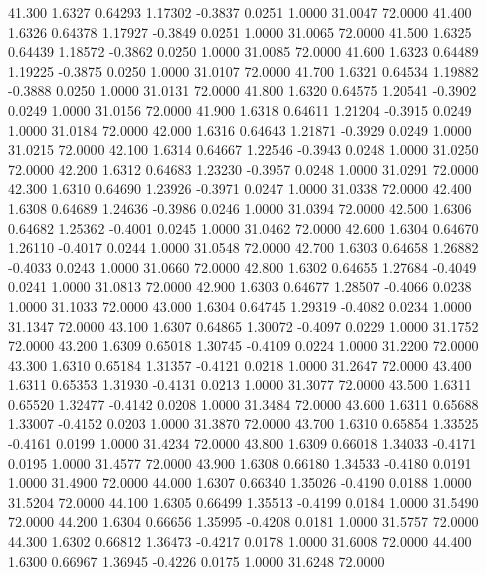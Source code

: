   41.300   1.6327   0.64293   1.17302  -0.3837   0.0251   1.0000  31.0047  72.0000
  41.400   1.6326   0.64378   1.17927  -0.3849   0.0251   1.0000  31.0065  72.0000
  41.500   1.6325   0.64439   1.18572  -0.3862   0.0250   1.0000  31.0085  72.0000
  41.600   1.6323   0.64489   1.19225  -0.3875   0.0250   1.0000  31.0107  72.0000
  41.700   1.6321   0.64534   1.19882  -0.3888   0.0250   1.0000  31.0131  72.0000
  41.800   1.6320   0.64575   1.20541  -0.3902   0.0249   1.0000  31.0156  72.0000
  41.900   1.6318   0.64611   1.21204  -0.3915   0.0249   1.0000  31.0184  72.0000
  42.000   1.6316   0.64643   1.21871  -0.3929   0.0249   1.0000  31.0215  72.0000
  42.100   1.6314   0.64667   1.22546  -0.3943   0.0248   1.0000  31.0250  72.0000
  42.200   1.6312   0.64683   1.23230  -0.3957   0.0248   1.0000  31.0291  72.0000
  42.300   1.6310   0.64690   1.23926  -0.3971   0.0247   1.0000  31.0338  72.0000
  42.400   1.6308   0.64689   1.24636  -0.3986   0.0246   1.0000  31.0394  72.0000
  42.500   1.6306   0.64682   1.25362  -0.4001   0.0245   1.0000  31.0462  72.0000
  42.600   1.6304   0.64670   1.26110  -0.4017   0.0244   1.0000  31.0548  72.0000
  42.700   1.6303   0.64658   1.26882  -0.4033   0.0243   1.0000  31.0660  72.0000
  42.800   1.6302   0.64655   1.27684  -0.4049   0.0241   1.0000  31.0813  72.0000
  42.900   1.6303   0.64677   1.28507  -0.4066   0.0238   1.0000  31.1033  72.0000
  43.000   1.6304   0.64745   1.29319  -0.4082   0.0234   1.0000  31.1347  72.0000
  43.100   1.6307   0.64865   1.30072  -0.4097   0.0229   1.0000  31.1752  72.0000
  43.200   1.6309   0.65018   1.30745  -0.4109   0.0224   1.0000  31.2200  72.0000
  43.300   1.6310   0.65184   1.31357  -0.4121   0.0218   1.0000  31.2647  72.0000
  43.400   1.6311   0.65353   1.31930  -0.4131   0.0213   1.0000  31.3077  72.0000
  43.500   1.6311   0.65520   1.32477  -0.4142   0.0208   1.0000  31.3484  72.0000
  43.600   1.6311   0.65688   1.33007  -0.4152   0.0203   1.0000  31.3870  72.0000
  43.700   1.6310   0.65854   1.33525  -0.4161   0.0199   1.0000  31.4234  72.0000
  43.800   1.6309   0.66018   1.34033  -0.4171   0.0195   1.0000  31.4577  72.0000
  43.900   1.6308   0.66180   1.34533  -0.4180   0.0191   1.0000  31.4900  72.0000
  44.000   1.6307   0.66340   1.35026  -0.4190   0.0188   1.0000  31.5204  72.0000
  44.100   1.6305   0.66499   1.35513  -0.4199   0.0184   1.0000  31.5490  72.0000
  44.200   1.6304   0.66656   1.35995  -0.4208   0.0181   1.0000  31.5757  72.0000
  44.300   1.6302   0.66812   1.36473  -0.4217   0.0178   1.0000  31.6008  72.0000
  44.400   1.6300   0.66967   1.36945  -0.4226   0.0175   1.0000  31.6248  72.0000

